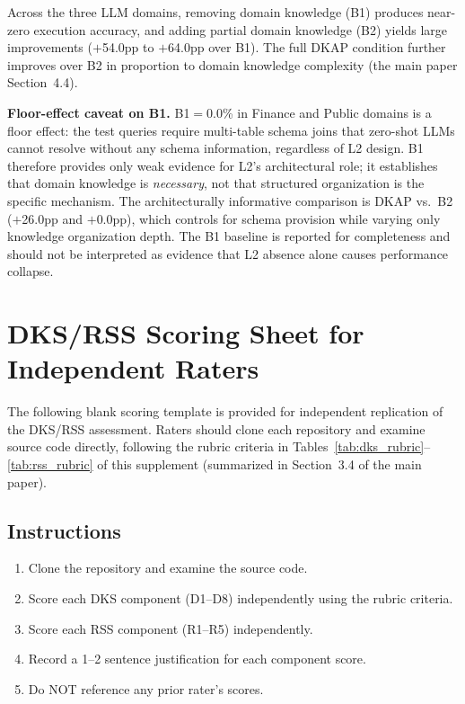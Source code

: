 \documentclass[10pt,a4paper]{article}
\begin{document}
Across the three LLM domains, removing domain knowledge (B1) produces near-zero execution accuracy, and adding partial domain knowledge (B2) yields large improvements ($+$54.0pp to $+$64.0pp over B1). The full DKAP condition further improves over B2 in proportion to domain knowledge complexity (the main paper Section~4.4).

\textbf{Floor-effect caveat on B1.} B1$=$0.0\% in Finance and Public domains is a floor effect: the test queries require multi-table schema joins that zero-shot LLMs cannot resolve without any schema information, regardless of L2 design. B1 therefore provides only weak evidence for L2's architectural role; it establishes that domain knowledge is \textit{necessary}, not that structured organization is the specific mechanism. The architecturally informative comparison is DKAP vs.\ B2 ($+$26.0pp and $+$0.0pp), which controls for schema provision while varying only knowledge organization depth. The B1 baseline is reported for completeness and should not be interpreted as evidence that L2 absence alone causes performance collapse.



\section{DKS/RSS Scoring Sheet for Independent Raters}
\label{sec:scoring_sheet}

The following blank scoring template is provided for independent replication of the DKS/RSS assessment. Raters should clone each repository and examine source code directly, following the rubric criteria in Tables~\ref{tab:dks_rubric}--\ref{tab:rss_rubric} of this supplement (summarized in Section~3.4 of the main paper).

\subsection{Instructions}
\begin{enumerate}
\item Clone the repository and examine the source code.
\item Score each DKS component (D1--D8) independently using the rubric criteria.
\item Score each RSS component (R1--R5) independently.
\item Record a 1--2 sentence justification for each component score.
\item Do NOT reference any prior rater's scores.
\end{enumerate}
\end{document}
